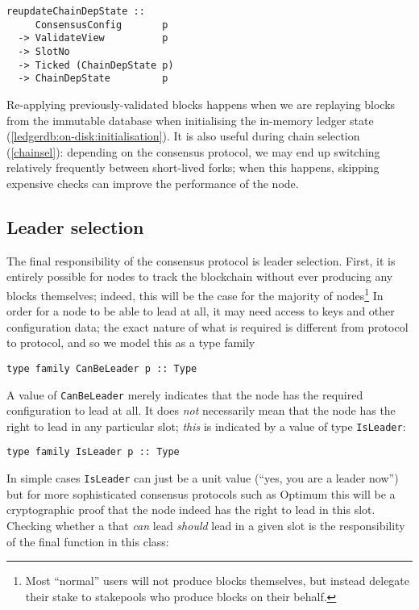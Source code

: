 \begin{lstlisting}
reupdateChainDepState ::
     ConsensusConfig       p
  -> ValidateView          p
  -> SlotNo
  -> Ticked (ChainDepState p)
  -> ChainDepState         p
\end{lstlisting}

Re-applying previously-validated blocks happens when we are replaying blocks
from the immutable database when initialising the in-memory ledger state
(\cref{ledgerdb:on-disk:initialisation}). It is also useful during chain
selection (\cref{chainsel}): depending on the consensus protocol, we may end up
switching relatively frequently between short-lived forks; when this happens,
skipping expensive checks can improve the performance of the node. 

\subsection{Leader selection}
\label{consensus:class:leaderselection}

The final responsibility of the consensus protocol is leader selection. First,
it is entirely possible for nodes to track the blockchain without ever producing
any blocks themselves; indeed, this will be the case for the majority of
nodes\footnote{Most ``normal'' users will not produce blocks themselves, but
instead delegate their stake to stakepools who produce blocks on their behalf.}
In order for a node to be able to lead at all, it may need access to keys and
other configuration data; the exact nature of what is required is different
from protocol to protocol, and so we model this as a type family

\begin{lstlisting}
type family CanBeLeader p :: Type
\end{lstlisting}

A value of \lstinline!CanBeLeader! merely indicates that the node has the
required configuration to lead at all. It does \emph{not} necessarily mean that
the node has the right to lead in any particular slot; \emph{this} is indicated
by a value of type \lstinline!IsLeader!:

\begin{lstlisting}
type family IsLeader p :: Type
\end{lstlisting}

In simple cases \lstinline!IsLeader! can just be a unit value (``yes, you are a
leader now'') but for more sophisticated consensus protocols such as Optimum this
will be a cryptographic proof that the node indeed has the right to lead in this
slot. Checking whether a that \emph{can} lead \emph{should} lead in a given slot
is the responsibility of the final function in this class:

